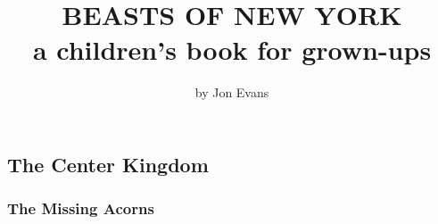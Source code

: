 \documentclass[12pt]{book}
\title{BEASTS OF NEW YORK\\a children's book for grown-ups}
\author{by Jon Evans}
\date{}
\begin{document}
\maketitle

\part{}

\chapter{The Center Kingdom}

\section{The Missing Acorns}
\end{document}
